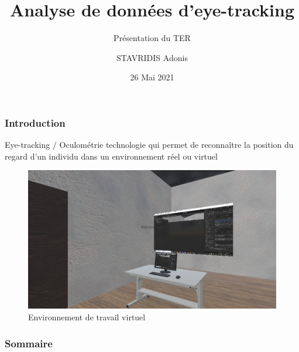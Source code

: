 \documentclass{beamer}
\title[Analyse de données d'eye-tracking]{Analyse de données d'eye-tracking}
\subtitle{Présentation du TER}
\author[STAVRIDIS Adonis]{STAVRIDIS Adonis}
\institute[Unistra, iCube]{
  Université de Strasbourg \and iCube
}
\date[TER]{26 Mai 2021}
\begin{document}
\frame{\titlepage}
\begin{frame}
  \frametitle{Introduction}

  \begin{block}{Eye-tracking / Oculométrie}
    technologie qui permet de reconnaître la position du regard d’un individu
    dans un environnement réel ou virtuel
  \end{block}
  \pause
  \begin{figure}
    \includegraphics[height=0.35\textwidth]{environnement.png}
    \caption{Environnement de travail virtuel}
  \end{figure}
\end{frame}
\begin{frame}
  \frametitle{Sommaire}

  \tableofcontents
\end{frame}
\end{document}
